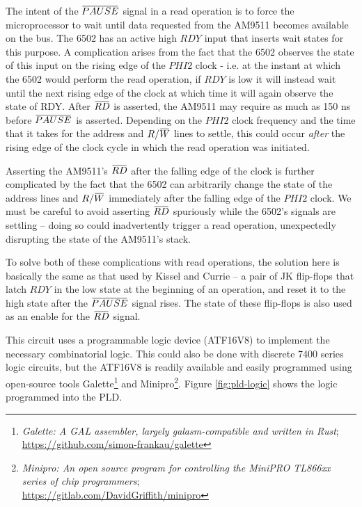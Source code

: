 \documentclass[11pt, letterpaper]{article}
\newcommand{\overbar}[1]{\mkern 1.5mu\overline{\mkern-1.5mu#1\mkern-1.5mu}\mkern 1.5mu}
\begin{document}
The intent of the $\overbar{PAUSE}$ signal in a read operation is to 
force the microprocessor to wait until data requested from the AM9511 
becomes available on the bus. The 6502 has an active high $RDY$ input 
that inserts wait states for this purpose. A complication arises from 
the fact that the 6502 observes the state of this input on the rising 
edge of the $PHI2$ clock - i.e. at the instant at which the 6502 would 
perform the read operation, if $RDY$ is low it will instead wait until 
the next rising edge of the clock at which time it will again observe 
the state of RDY. After $\overbar{RD}$ is asserted, the AM9511 may 
require as much as 150 ns before $\overbar{PAUSE}$ is asserted. 
Depending on the $PHI2$ clock frequency and the time that it takes for 
the address and $R/\overbar{W}$ lines to settle, this could occur 
\emph{after} the rising edge of the clock cycle in which the read 
operation was initiated.

Asserting the AM9511’s $\overbar{RD}$ after the falling edge of the 
clock is further complicated by the fact that the 6502 can arbitrarily 
change the state of the address lines and $R/\overbar{W}$ immediately 
after the falling edge of the $PHI2$ clock. We must be careful to avoid
asserting $\overbar{RD}$ spuriously while the 6502’s signals are 
settling -- doing so could inadvertently trigger a read operation, 
unexpectedly disrupting the state of the AM9511’s stack.

To solve both of these complications with read operations, the solution
here is basically the same as that used by Kissel and Currie -- a pair 
of JK flip-flops that latch $RDY$ in the low state at the beginning of an
operation, and reset it to the high state after the $\overbar{PAUSE}$ 
signal rises. The state of these flip-flops is also used as an enable for 
the $\overbar{RD}$ signal.

This circuit uses a programmable logic device (ATF16V8) to implement the 
necessary combinatorial logic. This could also be done with discrete 7400 
series logic circuits, but the ATF16V8 is readily available and easily 
programmed using open-source tools Galette\footnote{\emph{Galette: A 
GAL assembler, largely galasm-compatible and written in Rust}; \\
\url{https://github.com/simon-frankau/galette}} 
and Minipro\footnote{\emph{Minipro: An open source program for controlling 
the MiniPRO TL866xx series of chip programmers}; \\
\url{https://gitlab.com/DavidGriffith/minipro}}. 
Figure 
\ref{fig:pld-logic} shows the logic programmed into the PLD.
\end{document}
